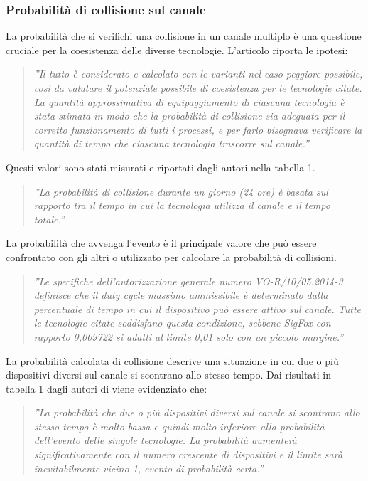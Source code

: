 \documentclass[a4paper]{report} %
\begin{document}
\subsubsection{Probabilità di collisione sul canale}
La probabilità che si verifichi una collisione in un canale multiplo è una questione cruciale per la coesistenza delle diverse tecnologie. L'articolo \cite{art:rif.46} riporta le ipotesi:
\begin{quote}
	\textit{''Il tutto è considerato e calcolato con le varianti nel caso peggiore possibile, così da valutare il potenziale possibile di coesistenza per le tecnologie citate. La quantità approssimativa di equipaggiamento di ciascuna tecnologia è stata stimata in modo che la probabilità di collisione sia adeguata per il corretto funzionamento di tutti i processi, e per farlo bisognava verificare la quantità di tempo che ciascuna tecnologia trascorre sul canale.''}
\end{quote}
Questi valori sono stati misurati e riportati dagli autori nella tabella 1. 
\begin{quote}
	\textit{''La probabilità di collisione durante un giorno (24 ore) è basata sul rapporto tra il tempo in cui la tecnologia utilizza il canale e il tempo totale.''}
\end{quote}
La probabilità che avvenga l'evento è il principale valore che può essere confrontato con gli altri o utilizzato per calcolare la probabilità di collisioni. 
\begin{quote}
	\textit{''Le specifiche dell'autorizzazione generale numero VO-R/10/05.2014-3 definisce che il duty cycle massimo ammissibile è determinato dalla percentuale di tempo in cui il dispositivo può essere attivo sul canale. Tutte le tecnologie citate soddisfano questa condizione, sebbene SigFox con rapporto 0,009722 si adatti al limite 0,01 solo con un piccolo margine.''}
\end{quote}
La probabilità calcolata di collisione descrive una situazione in cui due o più dispositivi diversi sul canale si scontrano allo stesso tempo. Dai risultati in tabella 1 dagli autori di \cite{art:rif.46} viene evidenziato che: 
\begin{quote}
	\textit{''La probabilità che due o più dispositivi diversi sul canale si scontrano allo stesso tempo è molto bassa e quindi molto inferiore alla probabilità dell'evento delle singole tecnologie. La probabilità aumenterà significativamente con il numero crescente di dispositivi e il limite sarà inevitabilmente vicino 1, evento di probabilità certa.''}
\end{quote}
\end{document}
